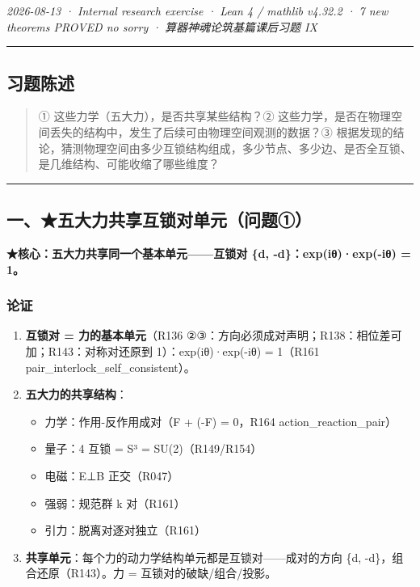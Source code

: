 \documentclass[
]{article}
\providecommand{\tightlist}{%
  \setlength{\itemsep}{0pt}\setlength{\parskip}{0pt}}
\begin{document}
\emph{2026-08-13 · Internal research exercise · Lean 4 / mathlib v4.32.2
· 7 new theorems PROVED no sorry · 算器神魂论筑基篇课后习题 IX }

\begin{center}\rule{0.5\linewidth}{0.5pt}\end{center}

\subsection{习题陈述}\label{ux4e60ux9898ux9648ux8ff0}

\begin{quote}
① 这些力学（五大力），是否共享某些结构？②
这些力学，是否在物理空间丢失的结构中，发生了后续可由物理空间观测的数据？③
根据发现的结论，猜测物理空间由多少互锁结构组成，多少节点、多少边、是否全互锁、是几维结构、可能收缩了哪些维度？
\end{quote}

\begin{center}\rule{0.5\linewidth}{0.5pt}\end{center}

\subsection{一、★五大力共享互锁对单元（问题①）}\label{ux4e00ux4e94ux5927ux529bux5171ux4eabux4e92ux9501ux5bf9ux5355ux5143ux95eeux9898ux2460}

\textbf{★核心：五大力共享同一个基本单元------互锁对 \{d,
-d\}：exp(iθ)·exp(-iθ) = 1。}

\subsubsection{论证}\label{ux8bbaux8bc1}

\begin{enumerate}
\def\labelenumi{\arabic{enumi}.}
\tightlist
\item
  \textbf{互锁对 = 力的基本单元}（R136
  ②③：方向必须成对声明；R138：相位差可加；R143：对称对还原到
  1）：exp(iθ)·exp(-iθ) = 1（R161 pair\_interlock\_self\_consistent）。
\item
  \textbf{五大力的共享结构}：

  \begin{itemize}
  \tightlist
  \item
    力学：作用-反作用成对（F + (-F) = 0，R164 action\_reaction\_pair）
  \item
    量子：4 互锁 = S³ = SU(2)（R149/R154）
  \item
    电磁：E⊥B 正交（R047）
  \item
    强弱：规范群 k 对（R161）
  \item
    引力：脱离对逐对独立（R161）
  \end{itemize}
\item
  \textbf{共享单元}：每个力的动力学结构单元都是互锁对------成对的方向
  \{d, -d\}，组合还原（R143）。力 = 互锁对的破缺/组合/投影。
\end{enumerate}
\end{document}
